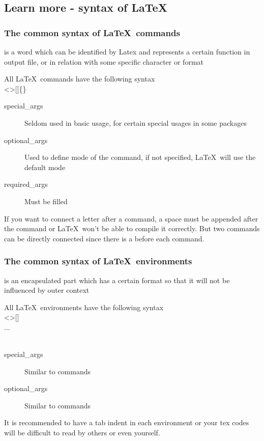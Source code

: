 \subsection{Learn more - syntax of \LaTeX}

\begin{frame}
	\frametitle{The common syntax of \LaTeX\ commands}
	\begin{definition}
		 is a word which can be identified by Latex and represents a certain function in output file, or in relation with some specific character or format
	\end{definition}
	All \LaTeX\ commands have the following syntax\\
	\textless {}\textgreater []\{\}
	\begin{description}
		\item[special\_args]	Seldom used in basic usage, for certain special usages in some packages
		\item[optional\_args]	Used to define mode of the command, if not specified, \LaTeX\ will use the default mode
		\item[required\_args]	Must be filled
	\end{description}
	If you want to connect a letter after a command, a space must be appended after the command or \LaTeX\ won't be able to compile it correctly. But two commands can be directly connected since there is a \structure{\textbackslash} before each command.
\end{frame}

\begin{frame}
	\frametitle{The common syntax of \LaTeX\ environments}
	\begin{definition}
		 is an encapsulated part which has a certain format so that it will not be influenced by outer context
	\end{definition}
	All \LaTeX\ environments have the following syntax\\
	\textless {}\textgreater []\\
	\qquad...\\
	\\
	\begin{description}
		\item[special\_args]	Similar to commands
		\item[optional\_args]	Similar to commands
	\end{description}
	It is recommended to have a tab indent in each environment or your tex codes will be difficult to read by others or even \alert{yourself}.
\end{frame}

